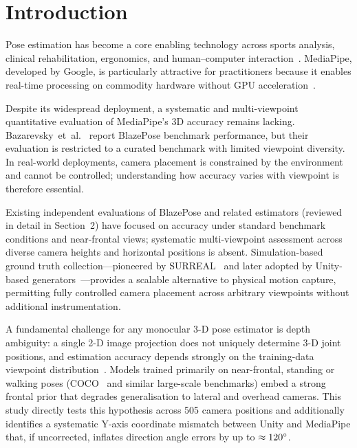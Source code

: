 \documentclass[twocolumn]{article}
\begin{document}
\vspace{-0.8em}

\section{Introduction}

Pose estimation has become a core enabling technology across sports
analysis, clinical rehabilitation, ergonomics, and human--computer
interaction~\cite{mediapipe,blazepose}. MediaPipe, developed by Google, is
particularly attractive for practitioners because it enables real-time
processing on commodity hardware without GPU acceleration~\cite{mediapipe}.

Despite its widespread deployment, a systematic and multi-viewpoint
quantitative evaluation of MediaPipe's 3D accuracy remains lacking.
Bazarevsky~et~al.~\cite{blazepose} report BlazePose benchmark performance,
but their evaluation is restricted to a curated benchmark with limited
viewpoint diversity. In real-world deployments, camera placement is
constrained by the environment and cannot be controlled; understanding how
accuracy varies with viewpoint is therefore essential.

Existing independent evaluations of BlazePose and related estimators
(reviewed in detail in Section~2) have focused on accuracy under standard
benchmark conditions and near-frontal views; systematic multi-viewpoint
assessment across diverse camera heights and horizontal positions is
absent. Simulation-based ground truth collection---pioneered
by SURREAL~\cite{surreal} and later adopted by Unity-based
generators~\cite{peoplesanspeople}---provides a scalable alternative to
physical motion capture, permitting fully controlled camera placement across
arbitrary viewpoints without additional instrumentation.

A fundamental challenge for any monocular 3-D pose estimator is depth
ambiguity: a single 2-D image projection does not uniquely determine 3-D
joint positions, and estimation accuracy depends strongly on the training-data
viewpoint distribution~\cite{mehta2017}. Models trained primarily on
near-frontal, standing or walking poses (COCO~\cite{coco} and similar
large-scale benchmarks) embed a strong frontal prior that degrades generalisation
to lateral and overhead cameras. This study directly tests this hypothesis
across 505 camera positions and additionally identifies a systematic
Y-axis coordinate mismatch between Unity and MediaPipe that, if uncorrected,
inflates direction angle errors by up to $\approx120\degree{}$.
\end{document}
